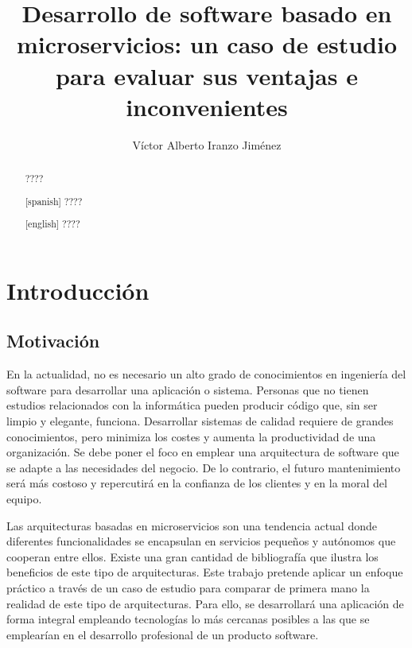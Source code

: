 \documentclass[11pt,spanish,listoffigures]{tfgetsinf}
\title{ Desarrollo de software basado en microservicios: un caso de estudio para evaluar sus ventajas e inconvenientes }
\author{Víctor Alberto Iranzo Jiménez}
\begin{document}

\begin{abstract}
????
\end{abstract}
\begin{abstract}[spanish]
????
\end{abstract}
\begin{abstract}[english]
????
\end{abstract}


\mainmatter


\chapter{Introducci\'on}

\section{Motivaci\'on}

En la actualidad, no es necesario un alto grado de conocimientos en ingeniería del software para desarrollar una aplicación o sistema. Personas que no tienen estudios relacionados con la informática pueden producir código que, sin ser limpio y elegante, funciona. Desarrollar sistemas de calidad requiere de grandes conocimientos, pero minimiza los costes y aumenta la productividad de una organización. Se debe poner el foco en emplear una arquitectura de software que se adapte a las necesidades del negocio. De lo contrario, el futuro mantenimiento será más costoso y repercutirá en la confianza de los clientes y en la moral del equipo. \cite{Martin2017}

Las arquitecturas basadas en microservicios son una tendencia actual donde diferentes funcionalidades se encapsulan en servicios pequeños y autónomos que cooperan entre ellos. Existe una gran cantidad de bibliografía que ilustra los beneficios de este tipo de arquitecturas. Este trabajo pretende aplicar un enfoque práctico a través de un caso de estudio para comparar de primera mano la realidad de este tipo de arquitecturas. Para ello, se desarrollará una aplicación de forma integral empleando tecnologías lo más cercanas posibles a las que se emplearían en el desarrollo profesional de un producto software.
\end{document}
